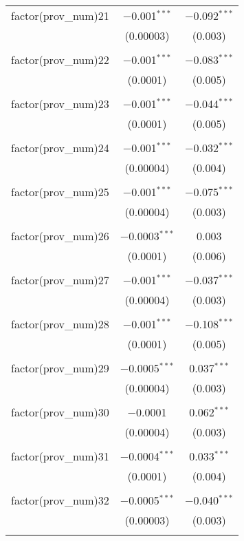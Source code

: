 \begin{table}[ht!]
\begin{tabular}{@{\extracolsep{5pt}}lcc}
 factor(prov\_num)21 & $-$0.001$^{***}$ & $-$0.092$^{***}$ \\ 
  & (0.00003) & (0.003) \\ 
  & & \\ 
 factor(prov\_num)22 & $-$0.001$^{***}$ & $-$0.083$^{***}$ \\ 
  & (0.0001) & (0.005) \\ 
  & & \\ 
 factor(prov\_num)23 & $-$0.001$^{***}$ & $-$0.044$^{***}$ \\ 
  & (0.0001) & (0.005) \\ 
  & & \\ 
 factor(prov\_num)24 & $-$0.001$^{***}$ & $-$0.032$^{***}$ \\ 
  & (0.00004) & (0.004) \\ 
  & & \\ 
 factor(prov\_num)25 & $-$0.001$^{***}$ & $-$0.075$^{***}$ \\ 
  & (0.00004) & (0.003) \\ 
  & & \\ 
 factor(prov\_num)26 & $-$0.0003$^{***}$ & 0.003 \\ 
  & (0.0001) & (0.006) \\ 
  & & \\ 
 factor(prov\_num)27 & $-$0.001$^{***}$ & $-$0.037$^{***}$ \\ 
  & (0.00004) & (0.003) \\ 
  & & \\ 
 factor(prov\_num)28 & $-$0.001$^{***}$ & $-$0.108$^{***}$ \\ 
  & (0.0001) & (0.005) \\ 
  & & \\ 
 factor(prov\_num)29 & $-$0.0005$^{***}$ & 0.037$^{***}$ \\ 
  & (0.00004) & (0.003) \\ 
  & & \\ 
 factor(prov\_num)30 & $-$0.0001 & 0.062$^{***}$ \\ 
  & (0.00004) & (0.003) \\ 
  & & \\ 
 factor(prov\_num)31 & $-$0.0004$^{***}$ & 0.033$^{***}$ \\ 
  & (0.0001) & (0.004) \\ 
  & & \\ 
 factor(prov\_num)32 & $-$0.0005$^{***}$ & $-$0.040$^{***}$ \\ 
  & (0.00003) & (0.003) \\ 
  & & \\ 

\end{tabular}
\end{table}
